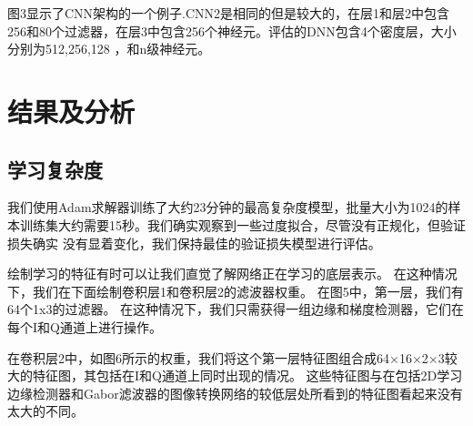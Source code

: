 图3显示了CNN架构的一个例子.CNN2是相同的但是较大的，在层1和层2中包含256和80个过滤器，在层3中包含256个神经元。评估的DNN包含4个密度层，大小分别为512,256,128 ，和n级神经元。\par

\section{结果及分析}

\subsection{学习复杂度}
我们使用Adam求解器训练了大约23分钟的最高复杂度模型，批量大小为1024的样本训练集大约需要15秒。我们确实观察到一些过度拟合，尽管没有正规化，但验证损失确实 没有显着变化，我们保持最佳的验证损失模型进行评估。\par

绘制学习的特征有时可以让我们直觉了解网络正在学习的底层表示。 在这种情况下，我们在下面绘制卷积层1和卷积层2的滤波器权重。 在图5中，第一层，我们有64个1x3的过滤器。 在这种情况下，我们只需获得一组边缘和梯度检测器，它们在每个I和Q通道上进行操作。\par

在卷积层2中，如图6所示的权重，我们将这个第一层特征图组合成64×16×2×3较大的特征图，其包括在I和Q通道上同时出现的情况。 这些特征图与在包括2D学习边缘检测器和Gabor滤波器的图像转换网络的较低层处所看到的特征图看起来没有太大的不同。\par

